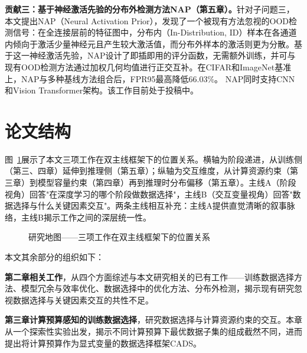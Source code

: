 \textbf{贡献三：基于神经激活先验的分布外检测方法NAP（第五章）。}针对子问题三，本文提出NAP（Neural Activation Prior），发现了一个被现有方法忽视的OOD检测信号：在全连接层前的特征图中，分布内（In-Distribution, ID）样本在各通道内倾向于激活少量神经元且产生较大激活值，而分布外样本的激活则更为分散。基于这一神经激活先验，NAP设计了即插即用的评分函数，无需额外训练，并可与现有OOD检测方法\cite{liu2020energy, hendrycks2016msp, sun2021react, sun2022dice, djurisic2022extremely, sun2022knn}通过加权几何均值进行正交互补。在CIFAR\cite{krizhevsky2009cifar}和ImageNet\cite{deng2009imagenet}基准上，NAP与多种基线方法组合后，FPR95最高降低66.03\%。%
NAP同时支持CNN和Vision Transformer\cite{dosovitskiy2020image}架构。该工作目前处于投稿中。


\section{论文结构}

图~\ref{fig:research-map}展示了本文三项工作在双主线框架下的位置关系。横轴为阶段递进，从训练侧（第三、四章）延伸到推理侧（第五章）；纵轴为交互维度，从计算资源约束（第三章）到模型容量约束（第四章）再到推理时分布偏移（第五章）。主线A（阶段视角）回答"在深度学习的哪个阶段做数据选择"，主线B（交互变量视角）回答"数据选择与什么关键因素交互"。两条主线相互补充：主线A提供直觉清晰的叙事脉络，主线B揭示工作之间的深层统一性。

\begin{figure}[htb]
  \centering
  \caption{研究地图——三项工作在双主线框架下的位置关系}
  \label{fig:research-map}
\end{figure}

本文其余部分的组织如下：

\textbf{第二章\quad 相关工作}，从四个方面综述与本文研究相关的已有工作——训练数据选择方法、模型冗余与效率优化、数据选择中的优化方法、分布外检测，揭示现有研究忽视数据选择与关键因素交互的共性不足。

\textbf{第三章\quad 计算预算感知的训练数据选择}，研究数据选择与计算资源约束的交互。本章从一个探索性实验出发，揭示不同计算预算下最优数据子集的组成截然不同，进而提出将计算预算作为显式变量的数据选择框架CADS。

